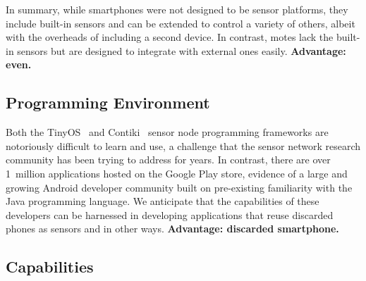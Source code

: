 \begin{comment}


Using this Turducken-esque~\cite{sorber2005turducken} tiered approach, we
should also be able to increase energy efficiency. By offloading sensing
tasks to the Arduino, we can reduce the devices's duty cycle, only needing to
periodically wake up to collect the samples from the Arduino.  Furthermore,
the Arduino should be much more efficient at sensing as the task better fits
its design. Using the discarded smartphone as the top level in this tier
still yields the advantage of being able to process and transmit this data on
the more-powerful and better-connected smartphone.
\end{comment}

In summary, while smartphones were not designed to be sensor platforms, they
include built-in sensors and can be extended to control a variety of others,
albeit with the overheads of including a second device. In contrast, motes
lack the built-in sensors but are designed to integrate with external ones
easily. \textbf{Advantage: even.}

\subsection{Programming Environment}

Both the TinyOS~\cite{tinyos} and Contiki~\cite{contiki} sensor node
programming frameworks are notoriously difficult to learn and use, a
challenge that the sensor network research community has been trying to
address for years. In contrast, there are over 1~million applications hosted
on the Google Play store, evidence of a large and growing Android developer
community built on pre-existing familiarity with the Java programming
language. We anticipate that the capabilities of these developers can be
harnessed in developing applications that reuse discarded phones as sensors
and in other ways. \textbf{Advantage: discarded smartphone.}

\subsection{Capabilities}



